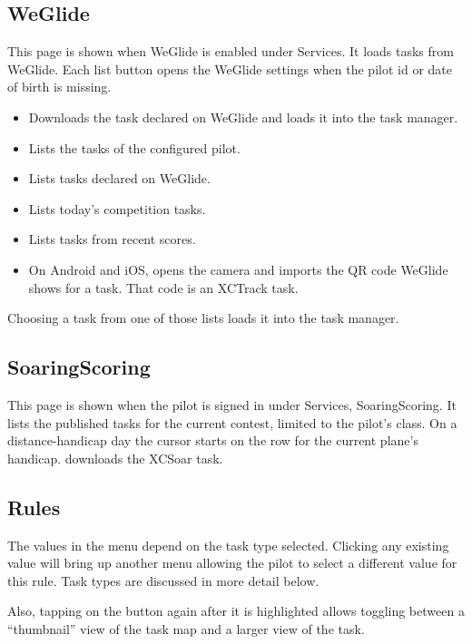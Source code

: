 \subsection*{WeGlide}
This page is shown when WeGlide is enabled under Services.  It loads
 tasks from WeGlide.  Each list button opens
the WeGlide settings when the pilot id or date of birth is missing.

\begin{itemize}
\item [\bmenuw{Download Declaration}] Downloads the task declared on
  WeGlide and loads it into the task manager.
\item [\bmenuw{My Tasks}] Lists the tasks of the configured pilot.
\item [\bmenuw{Declared Tasks}] Lists tasks declared on WeGlide.
\item [\bmenuw{Competitions Today}] Lists today's competition tasks.
\item [\bmenuw{Recent Scores}] Lists tasks from recent scores.
\item [\bmenuw{Scan QR Code}] On Android and iOS, opens the camera and
  imports the QR code WeGlide shows for a task.  That code is an XCTrack task.
\end{itemize}

Choosing a task from one of those lists loads it into the task manager.

\subsection*{SoaringScoring}
This page is shown when the pilot is signed in under Services,
 SoaringScoring.  It lists the published
tasks for the current contest, limited to the pilot's class.  On a
distance-handicap day the cursor starts on the row for the current
plane's handicap.   downloads the XCSoar task.

\subsection*{Rules}
The values in the menu depend on the task type selected. Clicking any existing
 value will bring up another menu allowing the pilot to select a
different value for this rule.  Task types are discussed in more detail below.

Also, tapping on the  button again after it is highlighted allows
toggling between a ``thumbnail'' view of the task map and a larger view of the task.

